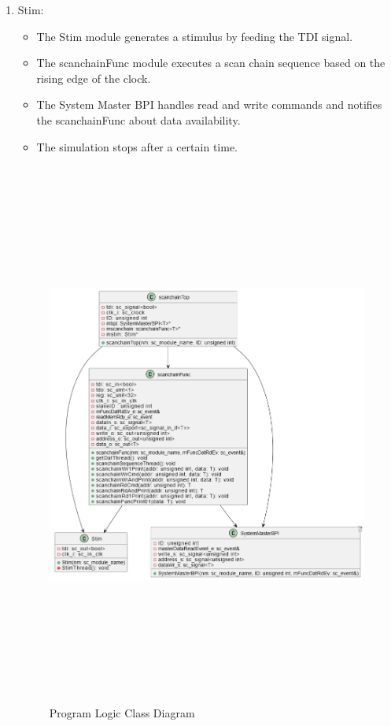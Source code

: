 \documentclass[a4paper,12pt,english]{report}
\begin{document}
\begin{enumerate}
    \item Stim:

\begin{itemize}
    \item The Stim module generates a stimulus by feeding the TDI signal.

    \item The scanchainFunc module executes a scan chain sequence based on the rising edge of the clock.

    \item The System Master BPI handles read and write commands and notifies the scanchainFunc about data availability.

    \item The simulation stops after a certain time.
\end{itemize}

\begin{figure}[h!]
  \centering
  \includegraphics[width=16cm, height=18cm]{classdia.drawio.png}
  \caption{Program Logic Class Diagram}
\end{figure}




\end{enumerate}
\end{document}
